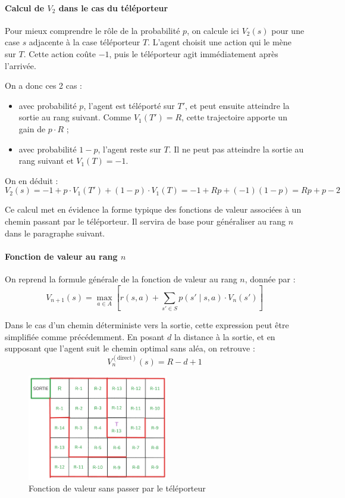 \documentclass[12pt]{article}
\begin{document}
\paragraph{Calcul de \(V_2\) dans le cas du téléporteur}

Pour mieux comprendre le rôle de la probabilité \(p\), on calcule ici \(V_2(s)\) pour une case \(s\) adjacente à la case téléporteur \(T\). L’agent choisit une action qui le mène sur \(T\). Cette action coûte \(-1\), puis le téléporteur agit immédiatement après l’arrivée.

On a donc ces 2 cas :
\begin{itemize}
    \item avec probabilité \(p\), l’agent est téléporté sur \(T'\), et peut ensuite atteindre la sortie au rang suivant. Comme \(V_1(T') = R\), cette trajectoire apporte un gain de \(p \cdot R\) ;
    \item avec probabilité \(1 - p\), l’agent reste sur \(T\). Il ne peut pas atteindre la sortie au rang suivant et \(V_1(T) = -1\).
\end{itemize}

On en déduit :
\[
V_2(s) = -1 + p \cdot V_1(T') + (1 - p) \cdot V_1(T) = -1 + Rp + (-1)(1 - p)
= Rp + p - 2
\]

Ce calcul met en évidence la forme typique des fonctions de valeur associées à un chemin passant par le téléporteur. Il servira de base pour généraliser au rang \(n\) dans le paragraphe suivant.


\paragraph{Fonction de valeur au rang \(n\)} 
On reprend la formule générale de la fonction de valeur au rang \(n\), donnée par :
\[
V_{n+1}(s) = \max_{a \in A} \left[ r(s,a) + \sum_{s' \in S} p(s' \mid s, a) \cdot V_n(s') \right]
\]

Dans le cas d’un chemin déterministe vers la sortie, cette expression peut être simplifiée comme précédemment. En posant \(d\) la distance à la sortie, et en supposant que l’agent suit le chemin optimal sans aléa, on retrouve :
\[
V_n^{(\text{direct})}(s) = R - d + 1
\]

\begin{figure}[H]
    \centering
    \includegraphics[width=0.55\textwidth]{labyrinthesortie1.png}
    \caption{Fonction de valeur sans passer par le téléporteur}
\end{figure}
\end{document}
